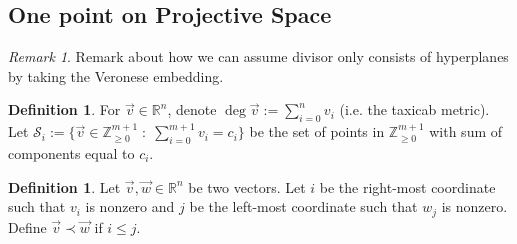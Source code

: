 \documentclass{amsart}
\theoremstyle{plain}
\theoremstyle{definition}
\newtheorem{defn}[thm]{Definition}
\theoremstyle{remark}
\newtheorem{rem}[thm]{Remark}
\numberwithin{equation}{section}
\newcommand\ssec{\subsection}
\newcommand\br{{\mathbb R}}
\newcommand\bz{{\mathbb Z}}
\newcommand\mss{\mathscr{S}}
\begin{document}


\ssec{One point on Projective Space}
\label{ssec:proj-one-point}

\begin{rem}
Remark about how we can assume divisor only consists of hyperplanes
by taking the Veronese embedding.
\end{rem}

\begin{defn}
\label{defn:vec-sum}
For $\vec{v} \in \br^n$, denote $\deg \vec{v} := \sum_{i = 0}
^n v_i$ (i.e. the taxicab metric).
Let $\mss_i := \{\vec{v} \in \bz_{\geq 0}^{m + 1} \; : \;
\sum_{i = 0} ^{m + 1} v_i = c_i\}$ be the set of points in
$\bz_{\geq 0}^{m + 1}$ with sum of components equal to $c_i$.
\end{defn}

\begin{defn}
\label{defn:vec-order}
Let $\vec{v}, \vec{w} \in \br^n$ be two vectors. Let $i$
be the right-most coordinate such that $v_i$ is nonzero
and $j$ be the left-most coordinate such that $w_j$ is
nonzero. Define $\vec{v} \prec \vec{w}$ if $i \leq j$.
\end{defn}
\end{document}
